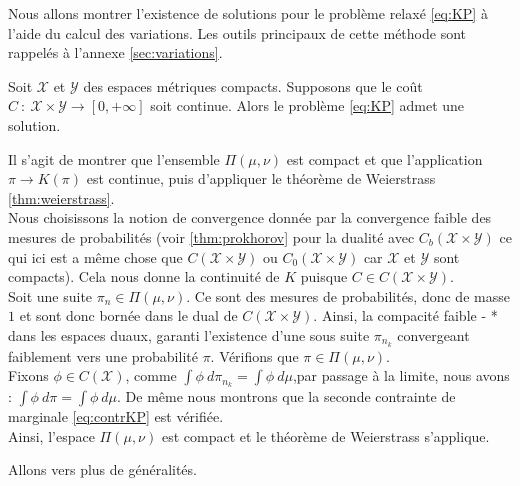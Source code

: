 \documentclass[a4paper,12pt]{article}
\begin{document}
Nous allons montrer l'existence de solutions pour le problème relaxé \eqref{eq:KP} à l'aide du calcul des variations. Les outils principaux de cette méthode sont rappelés à l'annexe \ref{sec:variations}. 
\begin{theoreme}{}
Soit $\mathcal{X}$ et $\mathcal{Y}$ des espaces métriques compacts. Supposons que le coût $C\ :\ \mathcal{X}\times\mathcal{Y}\rightarrow [0,+\infty]$ soit continue. Alors le problème \eqref{eq:KP} admet une solution.
\end{theoreme}
\begin{preuve}
Il s'agit de montrer que l'ensemble $\Pi (\mu,\nu)$ est compact et que l'application $\pi\rightarrow K(\pi )$ est continue, puis d'appliquer le théorème de Weierstrass \eqref{thm:weierstrass}. \\
Nous choisissons la notion de convergence donnée par la convergence faible des mesures de probabilités (voir \eqref{thm:prokhorov} pour la dualité avec $C_b(\mathcal{X}\times\mathcal{Y})$ ce qui ici est a même chose que $C(\mathcal{X}\times\mathcal{Y})$ ou $C_0(\mathcal{X}\times\mathcal{Y})$ car $\mathcal{X}$ et $\mathcal{Y}$ sont compacts). Cela nous donne la continuité de $K$ puisque $C\in C(\mathcal{X}\times\mathcal{Y})$. \\

Soit une suite $\pi_n\in\Pi (\mu,\nu )$. Ce sont des mesures de probabilités, donc de masse $1$ et sont donc bornée dans le dual de $C(\mathcal{X}\times\mathcal{Y})$. Ainsi, la compacité faible - * dans les espaces duaux, garanti l'existence d'une sous suite $\pi_{n_k}$ convergeant faiblement vers une probabilité $\pi$. 
Vérifions que $\pi \in \Pi (\mu,\nu )$. \\
Fixons $\phi\in C(\mathcal{X})$, comme $\int\phi\ d\pi_{n_k} =\int \phi\ d\mu $,par passage à la limite, nous avons : $\int\phi\ d\pi =\int\phi\ d\mu$. De même nous montrons que la seconde contrainte de marginale \eqref{eq:contrKP} est vérifiée. \\
Ainsi, l'espace $\Pi(\mu,\nu)$ est compact et le théorème de Weierstrass s'applique.
\end{preuve}

Allons vers plus de généralités. 
\end{document}

